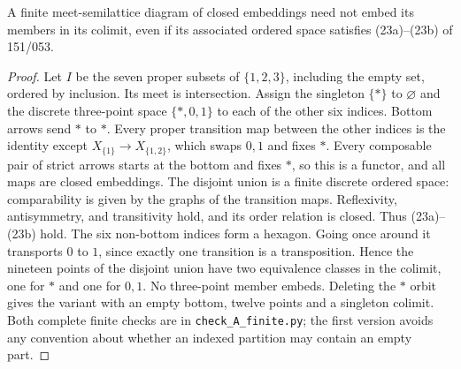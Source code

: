 \begin{result}\label{A4.2}
A finite meet-semilattice diagram of closed embeddings need not embed
its members in its colimit, even if its associated ordered space satisfies
(23a)--(23b) of 151/053.
\end{result}
\begin{proof}
Let $I$ be the seven proper subsets of $\{1,2,3\}$, including the empty
set, ordered by inclusion. Its meet is intersection. Assign the singleton
$\{*\}$ to $\varnothing$ and the discrete three-point space
$\{*,0,1\}$ to each of the other six indices. Bottom arrows send $*$ to
$*$. Every proper transition map between the other indices is the identity except
$X_{\{1\}}\to X_{\{1,2\}}$, which swaps $0,1$ and fixes $*$. Every
composable pair of strict arrows starts at the bottom and fixes $*$, so this is a
functor, and all maps are closed embeddings. The disjoint union is a
finite discrete ordered space: comparability is given by the graphs of
the transition maps. Reflexivity, antisymmetry, and transitivity hold,
and its order relation is closed. Thus (23a)--(23b) hold.
The six non-bottom indices form a hexagon. Going once around it transports
$0$ to $1$, since exactly one transition is a transposition. Hence the
nineteen points of the disjoint union have two equivalence classes in the
colimit, one for $*$ and one for $0,1$. No three-point member embeds.
Deleting the $*$ orbit gives the variant with an empty bottom, twelve
points and a singleton colimit. Both complete finite checks are in
\texttt{check\_A\_finite.py}; the first version avoids any convention
about whether an indexed partition may contain an empty part.
\end{proof}

